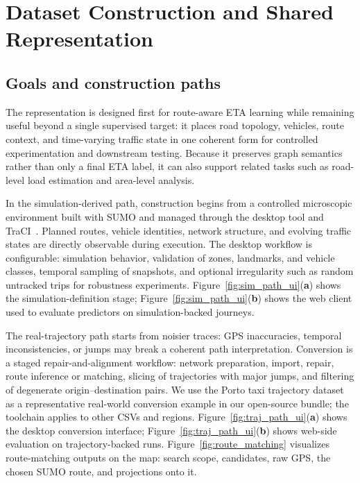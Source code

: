 \section{Dataset Construction and Shared Representation}\label{sec:dataset}

\subsection{Goals and construction paths}
The representation is designed first for route-aware ETA learning while remaining useful beyond a single supervised target: it places road topology, vehicles, route context, and time-varying traffic state in one coherent form for controlled experimentation and downstream testing. Because it preserves graph semantics rather than only a final ETA label, it can also support related tasks such as road-level load estimation and area-level analysis.

In the simulation-derived path, construction begins from a controlled microscopic environment built with SUMO and managed through the desktop tool and TraCI~\cite{sumo2011,traci2018}. Planned routes, vehicle identities, network structure, and evolving traffic states are directly observable during execution. The desktop workflow is configurable: simulation behavior, validation of zones, landmarks, and vehicle classes, temporal sampling of snapshots, and optional irregularity such as random untracked trips for robustness experiments.
Figure~\ref{fig:sim_path_ui}(\textbf{a}) shows the simulation-definition stage; Figure~\ref{fig:sim_path_ui}(\textbf{b}) shows the web client used to evaluate predictors on simulation-backed journeys.



The real-trajectory path starts from noisier traces: GPS inaccuracies, temporal inconsistencies, or jumps may break a coherent path interpretation. Conversion is a staged repair-and-alignment workflow: network preparation, import, repair, route inference or matching, slicing of trajectories with major jumps, and filtering of degenerate origin--destination pairs.
We use the Porto taxi trajectory dataset~\cite{porto2015pkdd} as a representative real-world conversion example in our open-source bundle; the toolchain applies to other CSVs and regions.
Figure~\ref{fig:traj_path_ui}(\textbf{a}) shows the desktop conversion interface; Figure~\ref{fig:traj_path_ui}(\textbf{b}) shows web-side evaluation on trajectory-backed runs.
Figure~\ref{fig:route_matching} visualizes route-matching outputs on the map: search scope, candidates, raw GPS, the chosen SUMO route, and projections onto it.

